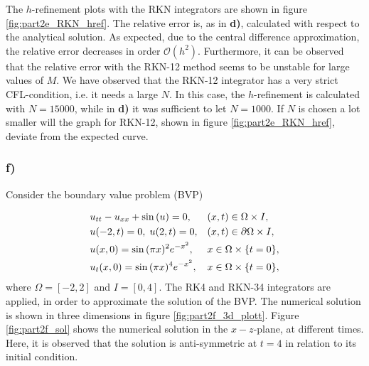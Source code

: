 The $h$-refinement plots with the RKN integrators are shown in figure \ref{fig:part2e_RKN_href}. The relative error is, as in \textbf{d)}, calculated with respect to the analytical solution. As expected, due to the central difference approximation, the relative error decreases in order $\mathcal{O}(h^2)$. Furthermore, it can be observed that the relative error with the RKN-12 method seems to be unstable for large values of $M$. We have observed that the RKN-12 integrator has a very strict CFL-condition, i.e. it needs a large $N$. In this case, the $h$-refinement is calculated with $N=15000$, while in \textbf{d)} it was sufficient to let $N=1000$. If $N$ is chosen a lot smaller will the graph for RKN-12, shown in figure \ref{fig:part2e_RKN_href}, deviate from the expected curve. 

\subsubsection*{f)}

Consider the boundary value problem (BVP)

\begin{align}
    &u_{tt} - u_{xx} + \sin{(u)} = 0, &&(x,t) \in \Omega \times I,  \\
    &u(-2,t) = 0, \hspace{1mm} u(2,t) = 0,  &&(x,t) \in \partial\Omega \times I, \\
    &u(x,0) = \sin{(\pi x)^2e^{-x^2}}, &&x \in \Omega \times \{t=0\}, \\
    &u_t(x,0) = \sin{(\pi x)^4e^{-x^2}}, &&x \in \Omega \times \{t=0\}, 
\end{align}
where $\Omega = [-2, 2]$ and $I = [0,4]$. The RK4 and RKN-34 integrators are applied, in order to approximate the solution of the BVP. The numerical solution is shown in three dimensions in figure \ref{fig:part2f_3d_plott}. Figure \ref{fig:part2f_sol} shows the numerical solution in the $x-z$-plane, at different times. Here, it is observed that the solution is anti-symmetric at $t=4$ in relation to its initial condition.

